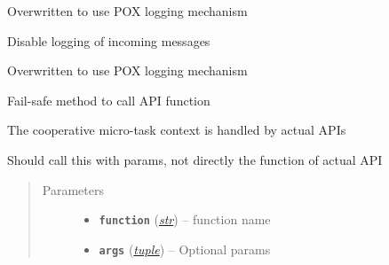\documentclass[letterpaper,10pt,english]{sphinxmanual}
\begin{document}
\begin{fulllineitems}
\begin{fulllineitems}
\label{util/api:escape.util.api.AbstractRequestHandler.log_error}
Overwritten to use POX logging mechanism

\end{fulllineitems}


\begin{fulllineitems}
\label{util/api:escape.util.api.AbstractRequestHandler.log_message}
Disable logging of incoming messages

\end{fulllineitems}


\begin{fulllineitems}
\label{util/api:escape.util.api.AbstractRequestHandler.log_full_message}
Overwritten to use POX logging mechanism

\end{fulllineitems}


\begin{fulllineitems}
\label{util/api:escape.util.api.AbstractRequestHandler._proceed_API_call}
Fail-safe method to call API function

The cooperative micro-task context is handled by actual APIs

Should call this with params, not directly the function of actual API
\begin{quote}\begin{description}
\item[{Parameters}] \leavevmode\begin{itemize}
\item {} 
\textbf{\texttt{function}} (\href{https://docs.python.org/2.7/library/functions.html\#str}{\emph{str}}) -- function name

\item {} 
\textbf{\texttt{args}} (\href{https://docs.python.org/2.7/library/functions.html\#tuple}{\emph{tuple}}) -- Optional params


\end{itemize}
\end{description}
\end{quote}
\end{fulllineitems}
\end{fulllineitems}
\end{document}
